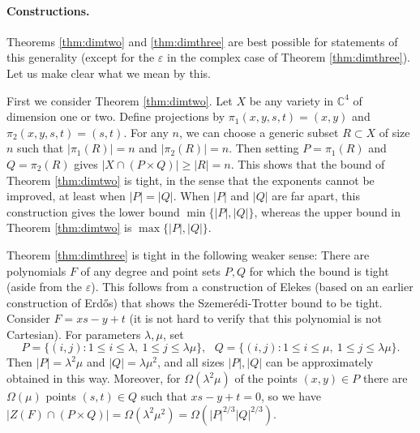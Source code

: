\documentclass{daj}
\theoremstyle{definition}
\newcommand{\C}{\mathbb C}
\newcommand{\eps}{\varepsilon}
\begin{document}

\paragraph{Constructions.}
Theorems \ref{thm:dimtwo} and \ref{thm:dimthree} are best possible for statements of this generality (except for the $\eps$ in the complex case of Theorem \ref{thm:dimthree}).
Let us make clear what we mean by this.

First we consider Theorem \ref{thm:dimtwo}.
Let $X$ be any variety in $\C^4$ of dimension one or two.
Define projections by $\pi_1(x,y,s,t) = (x,y)$ and $\pi_2(x,y,s,t) = (s,t)$.
For any $n$, we can choose a generic subset $R\subset X$ of size $n$ such that $|\pi_1(R)| = n$ and $|\pi_2(R)| = n$.
Then setting $P = \pi_1(R)$ and $Q = \pi_2(R)$ gives
 $|X\cap (P\times Q)| \geq |R| = n$.
 This shows that the bound of Theorem \ref{thm:dimtwo} is tight, in the sense that the exponents cannot be improved, at least when $|P|=|Q|$.
 When $|P|$ and $|Q|$ are far apart, this construction gives the lower bound $\min\{|P|,|Q|\}$, whereas the upper bound in Theorem \ref{thm:dimtwo} is $\max\{|P|,|Q|\}$.
 
 
 Theorem \ref{thm:dimthree} is tight in the following weaker sense: There are polynomials $F$ of any degree and point sets $P,Q$ for which the bound is tight (aside from the $\eps$).
This follows from a construction of Elekes \cite{El} (based on an earlier construction of Erd\H os) that shows the Szemer\'edi-Trotter bound to be tight.
Consider $F = xs -y+t$ (it is not hard to verify that this polynomial is not Cartesian).
For parameters $\lambda, \mu$, 
set 
\[P = \{(i,j):1\leq i\leq \lambda, ~1\leq j\leq \lambda \mu\},~~~Q = \{(i,j):1\leq i\leq \mu, ~1\leq j\leq \lambda \mu\}.\]
Then $|P|=\lambda^2\mu$ and $|Q| = \lambda\mu^2$, 
and all sizes $|P|,|Q|$ can be approximately obtained in this way.
Moreover, for $\Omega(\lambda^2\mu)$ of the points $(x,y)\in P$ there are $\Omega(\mu)$ points $(s,t)\in Q$ such that $xs-y+t = 0$, 
so we have $|Z(F)\cap (P\times Q)| = \Omega(\lambda^2\mu^2) =\Omega(|P|^{2/3}|Q|^{2/3})$.
\end{document}
